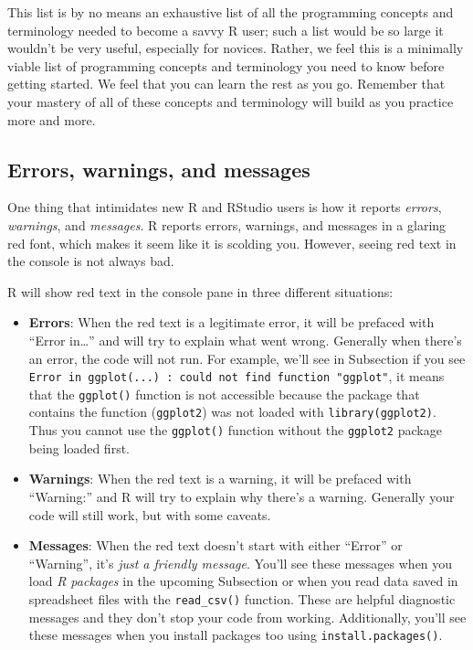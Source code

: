\documentclass[]{book}
\providecommand{\tightlist}{%
  \setlength{\itemsep}{0pt}\setlength{\parskip}{0pt}}
\begin{document}
This list is by no means an exhaustive list of all the programming concepts and terminology needed to become a savvy R user; such a list would be so large it wouldn't be very useful, especially for novices. Rather, we feel this is a minimally viable list of programming concepts and terminology you need to know before getting started. We feel that you can learn the rest as you go. Remember that your mastery of all of these concepts and terminology will build as you practice more and more.

\hypertarget{messages}{%
\subsection{Errors, warnings, and messages}\label{messages}}

One thing that intimidates new R and RStudio users is how it reports \emph{errors}, \emph{warnings}, and \emph{messages}. R reports errors, warnings, and messages in a glaring red font, which makes it seem like it is scolding you. However, seeing red text in the console is not always bad.

R will show red text in the console pane in three different situations:

\begin{itemize}
\tightlist
\item
  \textbf{Errors}: When the red text is a legitimate error, it will be prefaced with ``Error in\ldots{}'' and will try to explain what went wrong. Generally when there's an error, the code will not run. For example, we'll see in Subsection if you see \texttt{Error\ in\ ggplot(...)\ :\ could\ not\ find\ function\ "ggplot"}, it means that the \texttt{ggplot()} function is not accessible because the package that contains the function (\texttt{ggplot2}) was not loaded with \texttt{library(ggplot2)}. Thus you cannot use the \texttt{ggplot()} function without the \texttt{ggplot2} package being loaded first.
\item
  \textbf{Warnings}: When the red text is a warning, it will be prefaced with ``Warning:'' and R will try to explain why there's a warning. Generally your code will still work, but with some caveats.\\
\item
  \textbf{Messages}: When the red text doesn't start with either ``Error'' or ``Warning'', it's \emph{just a friendly message}. You'll see these messages when you load \emph{R packages} in the upcoming Subsection or when you read data saved in spreadsheet files with the \texttt{read\_csv()} function. These are helpful diagnostic messages and they don't stop your code from working. Additionally, you'll see these messages when you install packages too using \texttt{install.packages()}.
\end{itemize}
\end{document}
